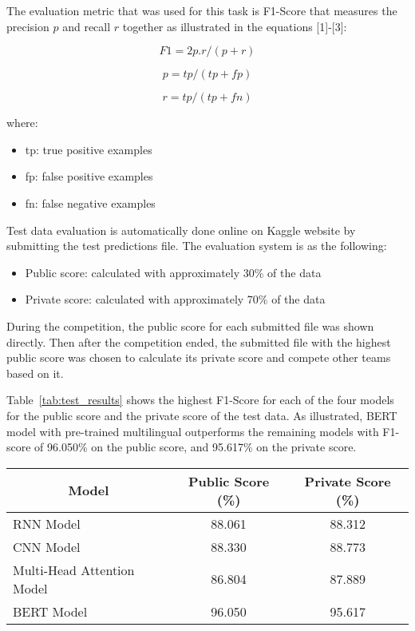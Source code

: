 \documentclass[11pt,a4paper]{article}
\begin{document}
The evaluation metric that was used for this task is F1-Score that measures the precision $p$ and recall $r$ together as illustrated in the  equations [1]-[3]:


\begin{equation}
F1 = 2 p.r /(p  + r)
\end{equation}

\begin{equation}
p = tp / (tp+fp)
\end{equation}

\begin{equation}
r = tp /(tp + fn)
\end{equation}

where:
\begin{itemize}
    \item tp: true positive examples
    \item fp: false positive examples
    \item  fn: false negative examples
\end{itemize}

\vspace{0.2in}

Test data evaluation is automatically done online on Kaggle website by submitting the test predictions file. The evaluation system is as the following:
\begin{itemize}
    \item Public score: calculated with approximately  30\% of the data
    \item Private score: calculated with approximately 70\% of the data
\end{itemize}


During the competition, the public score for each submitted file was shown directly. Then after the competition ended, the submitted file with the highest public score was chosen to calculate its private score and compete other teams based on it.

Table~\ref{tab:test_results} shows the highest F1-Score for each of the four models for the public score and the private score of the test data. As illustrated, BERT model with pre-trained multilingual outperforms the remaining models with F1-score of 96.050\% on the public score, and 95.617\% on the private score.

\begin{table*}
\centering
\begin{tabular}{|l|c|c|}
\hline
\multicolumn{1}{|c|}{Model}   & \multicolumn{1}{c|}{ Public Score (\%)}  & \multicolumn{1}{c|}{ Private Score (\%)}   \\ \hline
 
 RNN Model    &    88.061      &  88.312  \\ \hline
 CNN Model    &    88.330     &  88.773  \\ \hline
 Multi-Head Attention Model    &  86.804 &  87.889 \\ \hline
 BERT Model  &   96.050 & 95.617  \\ \hline
   
\end{tabular}
\caption{Results of 30\% of the test data}
\label{tab:test_results}
\end{table*}
\end{document}
